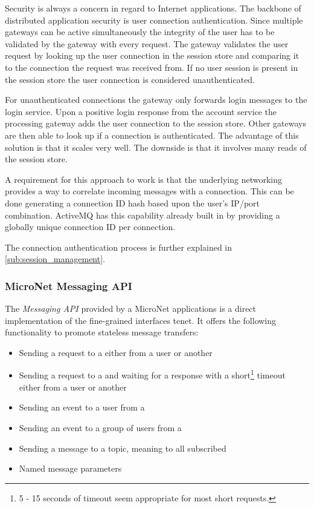 Security is always a concern in regard to Internet applications. The backbone
of distributed application security is user connection authentication.
Since multiple gateways can be active simultaneously the integrity of the user
has to be validated by the gateway with every request. The gateway validates the
user request by looking up the user connection in the session store and
comparing it to the connection the request was received from. If no user session
is present in the session store the user connection is considered
unauthenticated.

For unauthenticated connections the gateway only forwards login messages to the
login service. Upon a positive login response from the account service the
processing gateway adds the user connection to the session store. Other gateways
are then able to look up if a connection is authenticated. The advantage of this
solution is that it scales very well. The downside is that it involves many
reads of the session store.

A requirement for this approach to work is that the underlying networking
provides a way to correlate incoming messages with a connection. This can be
done generating a connection ID hash based upon the user's IP/port combination.
ActiveMQ has this capability already built in by providing a globally unique
connection ID per connection.

The connection authentication process is further explained in
\autoref{sub:session_management}.

\subsubsection{MicroNet Messaging API}

The \textit{Messaging API} provided by a MicroNet applications is a direct implementation
of the fine-grained interfaces tenet. It offers the following functionality to
promote stateless message transfers:

\begin{itemize}
  \item Sending a request to a \ms{} either from a user or another \ms{}
  \item Sending a request to a \ms{} and waiting for a response with a
  short\footnote{5 - 15 seconds of timeout seem appropriate for most short
  requests.} timeout either from a user or another \ms{}
  \item Sending an event to a user from a \ms{}
  \item Sending an event to a group of users from a \ms{}
  \item Sending a message to a topic, meaning to all subscribed \mss{}
  \item Named message parameters
\end{itemize}

